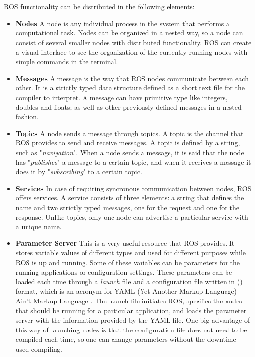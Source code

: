 ROS functionality can be distributed in the following elements:

\begin{itemize}

\item \textbf{Nodes} A node is any individual process in the system that performs a computational task. Nodes can be organized in a nested way, so a node can consist of several smaller nodes with distributed functionality. ROS can create a visual interface to see the organization of the currently running nodes with simple commands in the terminal.

\item \textbf{Messages} A message is the way that ROS nodes communicate between each other. It is a strictly typed data structure defined as a short text file for the compiler to interpret. A message can have primitive type like integers, doubles and floats; as well as other previously defined messages in a nested fashion.

\item \textbf{Topics} A node sends a message through topics. A topic is the channel that ROS provides to send and receive messages. A topic is defined by a string, such as "\emph{navigation}". When a node sends a message, it is said that the node has "\emph{published}" a message to a certain topic, and when it receives a message it does it by "\emph{subscribing}" to a certain topic.

\item \textbf{Services} In case of requiring syncronous communication between nodes, ROS offers services. A service consists of three elements: a string that defines the name and two strictly typed messages, one for the request and one for the response. Unlike topics, only one node can advertise a particular service with a unique name. 

\item \textbf{Parameter Server} This is a very useful resource that ROS provides. It stores variable values of different types and used for different purposes while ROS is up and running. Some of these variables can be parameters for the running applications or configuration settings. These parameters can be loaded each time through a \emph{launch} file and a configuration file written in () format, which is an acronym for YAML (Yet Another Markup Language) Ain't Markup Language \cite{Ben-kiki2004}. The launch file initiates ROS, specifies the nodes that should be running for a particular application, and loads the parameter server with the information provided by the YAML file. One big advantage of this way of launching nodes is that the configuration file does not need to be compiled each time, so one can change parameters without the downtime used compiling. 

\end{itemize}

